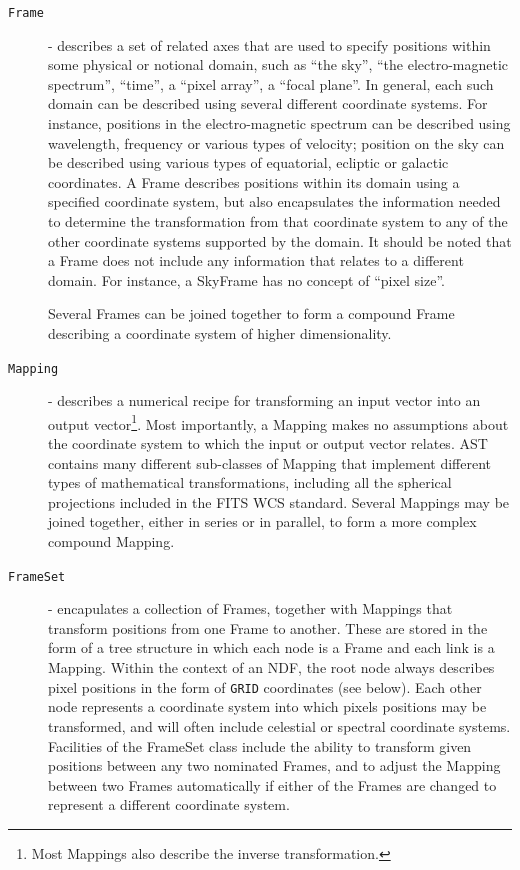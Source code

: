 \documentclass[final,authoryear,5p,times,twocolumn]{elsarticle}
\begin{document}
\begin{description}

\item[\texttt{Frame}] - describes a set of related axes that are used to
specify positions within some physical or notional domain, such as ``the
sky'', ``the electro-magnetic spectrum'', ``time'', a ``pixel array'', a
``focal plane''. In general, each such domain can be described using
several different coordinate systems. For instance, positions in the
electro-magnetic spectrum can be described using wavelength, frequency or
various types of velocity; position on the sky can be described using
various types of equatorial, ecliptic or galactic coordinates. A Frame
describes positions within its domain using a specified coordinate
system, but also encapsulates the information needed to determine the
transformation from that coordinate system to any of the other
coordinate systems supported by the domain. It should be noted that a
Frame does not include any information that relates to a different
domain. For instance, a SkyFrame has no concept of ``pixel size''.

Several Frames can be joined together to form a compound Frame describing
a coordinate system of higher dimensionality.

\item[\texttt{Mapping}] -  describes a numerical recipe for transforming
an input vector into an output vector\footnote{Most Mappings also describe the
inverse transformation.}. Most importantly, a Mapping makes
no assumptions about the coordinate system to which the input or output
vector relates. AST contains many different sub-classes of Mapping that
implement different types of mathematical transformations, including all
the spherical projections included in the FITS WCS standard. Several
Mappings may be joined together, either in series or in parallel, to form
a more complex compound Mapping.

\item[\texttt{FrameSet}] - encapulates a collection of Frames, together
with Mappings that transform positions from one Frame to another. These
are stored in the form of a tree structure in which each node is a Frame
and each link is a Mapping. Within the context of an NDF, the root node
always describes pixel positions in the form of \texttt{GRID} coordinates (see
below). Each other node represents a coordinate system into which pixels
positions may be transformed, and will often include celestial or
spectral coordinate systems. Facilities of the FrameSet class include the
ability to transform given positions between any two nominated Frames, and
to adjust the Mapping between two Frames automatically if either of the
Frames are changed to represent a different coordinate system.

\end{description}
\end{document}
